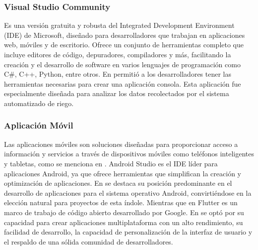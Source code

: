 \subsubsection{Visual Studio Community}
Es una versión gratuita y robusta del Integrated Development Environment (IDE) de Microsoft, diseñado para desarrolladores que trabajan en aplicaciones web, móviles y de escritorio. Ofrece un conjunto de herramientas completo que incluye editores de código, depuradores, compiladores y más, facilitando la creación y el desarrollo de software en varios lenguajes de programación como C\#, C++, Python, entre otros. En \cite{alcivar_dominguez_sistema_2018} permitió a los desarrolladores tener las herramientas necesarias para crear una aplicación consola. Esta aplicación fue especialmente diseñada para analizar los datos recolectados por el sistema automatizado de riego.

\subsubsection{Aplicación Móvil}
Las aplicaciones móviles son soluciones diseñadas para proporcionar acceso a información y servicios a través de dispositivos móviles como teléfonos inteligentes y tabletas, como se menciona en \cite{noauthor_fuzzy_2023}. Android Studio es el IDE líder para aplicaciones Android, ya que ofrece herramientas que simplifican la creación y optimización de aplicaciones. En \cite{castillo_herrero_desarrollo_2020} se destaca su posición predominante en el desarrollo de aplicaciones para el sistema operativo Android, convirtiéndose en la elección natural para proyectos de esta índole. Mientras que en Flutter es un marco de trabajo de código abierto desarrollado por Google. En \cite{ramos_galindo_diseno_2023} se optó por su capacidad para crear aplicaciones multiplataforma con un alto rendimiento, su facilidad de desarrollo, la capacidad de personalización de la interfaz de usuario y el respaldo de una sólida comunidad de desarrolladores.


